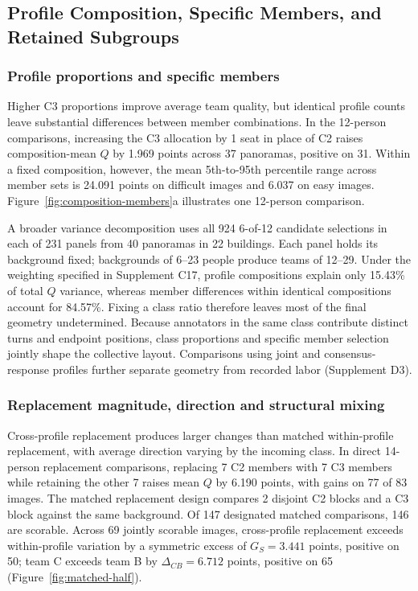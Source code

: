 \subsection{Profile Composition, Specific Members, and Retained Subgroups}
\label{sec:composition}
\subsubsection{Profile proportions and specific members}
\label{sec:composition-discussion-anchor}

Higher C3 proportions improve average team quality, but identical profile counts leave substantial differences between member combinations. In the 12-person comparisons, increasing the C3 allocation by 1 seat in place of C2 raises composition-mean $Q$ by 1.969 points across 37 panoramas, positive on 31. Within a fixed composition, however, the mean 5th-to-95th percentile range across member sets is 24.091 points on difficult images and 6.037 on easy images. Figure~\ref{fig:composition-members}a illustrates one 12-person comparison.



A broader variance decomposition uses all 924 6-of-12 candidate selections in each of 231 panels from 40 panoramas in 22 buildings. Each panel holds its background fixed; backgrounds of 6--23 people produce teams of 12--29. Under the weighting specified in Supplement C17, profile compositions explain only 15.43\% of total $Q$ variance, whereas member differences within identical compositions account for 84.57\%. Fixing a class ratio therefore leaves most of the final geometry undetermined. Because annotators in the same class contribute distinct turns and endpoint positions, class proportions and specific member selection jointly shape the collective layout. Comparisons using joint and consensus-response profiles further separate geometry from recorded labor (Supplement D3).

\subsubsection{Replacement magnitude, direction and structural mixing}

Cross-profile replacement produces larger changes than matched within-profile replacement, with average direction varying by the incoming class. In direct 14-person replacement comparisons, replacing 7 C2 members with 7 C3 members while retaining the other 7 raises mean $Q$ by 6.190 points, with gains on 77 of 83 images. The matched replacement design compares 2 disjoint C2 blocks and a C3 block against the same background. Of 147 designated matched comparisons, 146 are scorable. Across 69 jointly scorable images, cross-profile replacement exceeds within-profile variation by a symmetric excess of $G_S=3.441$ points, positive on 50; team C exceeds team B by $\Delta_{CB}=6.712$ points, positive on 65 (Figure~\ref{fig:matched-half}).

